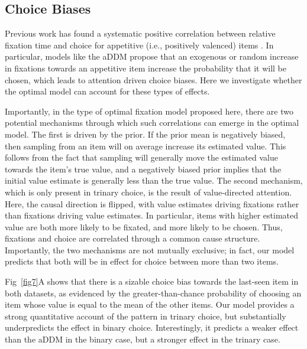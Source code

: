 \subsection{Choice Biases}

Previous work has found a systematic positive correlation between relative fixation time and choice for appetitive (i.e., positively valenced) items \citep{shimojo2003gaze,armel2008neuroeconomic,armel2008biasing,krajbich2010visual,krajbich2011multialternative, gluth2020valuebased}. In particular, models like the aDDM propose that an exogenous or random increase in fixations towards an appetitive item increase the probability that it will be chosen, which leads to attention driven choice biases.  Here we investigate whether the optimal model can account for these types of effects.

Importantly, in the type of optimal fixation model proposed here, there are two potential mechanisms through which such correlations can emerge in the optimal model. The first is driven by the prior. If the prior mean is negatively biased, then sampling from an item will on average increase its estimated value. This follows from the fact that sampling will generally move the estimated value towards the item's true value, and a negatively biased prior implies that the initial value estimate is generally less than the true value. The second mechanism, which is only present in trinary choice, is the result of value-directed attention. Here, the causal direction is flipped, with value estimates driving fixations rather than fixations driving value estimates. In particular, items with higher estimated value are both more likely to be fixated, and more likely to be chosen. Thus, fixations and choice are correlated through a common cause structure. Importantly, the two mechanisms are not mutually exclusive; in fact, our model predicts that both will be in effect for choice between more than two items.

Fig~\ref{fig7}A shows that there is a sizable choice bias towards the last-seen item in both datasets, as evidenced by the greater-than-chance probability of choosing an item whose value is equal to the mean of the other items. Our model provides a strong quantitative account of the pattern in trinary choice, but substantially underpredicts the effect in binary choice. Interestingly, it predicts a weaker effect than the aDDM in the binary case, but a stronger effect in the trinary case. 

